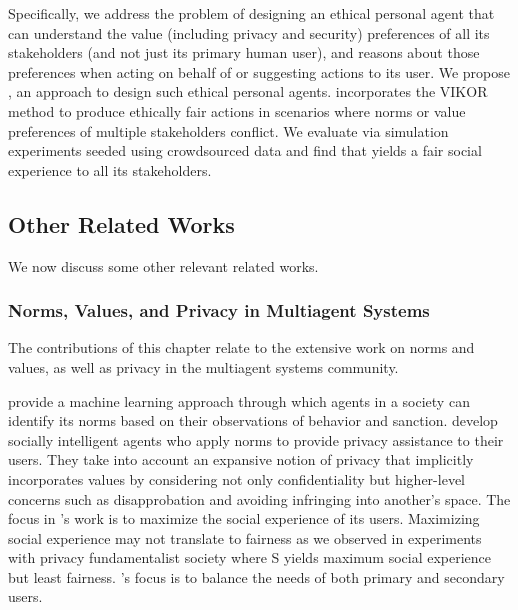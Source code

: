 Specifically, we address the problem of designing an ethical personal agent that can understand the value (including privacy and security) preferences of all its stakeholders (and not just its primary human user), and reasons about those preferences when acting on behalf of or suggesting actions to its user. We propose \frameworkAinur, an approach to design such ethical personal agents. \frameworkAinur incorporates the VIKOR method to produce ethically fair actions in scenarios where norms or value preferences of multiple stakeholders conflict. We evaluate \frameworkAinur via simulation experiments seeded using crowdsourced data and find that \frameworkAinur yields a fair  social experience to all its stakeholders.

\subsection{Other Related Works}

We now discuss some other relevant related works. 


\subsubsection{Norms, Values, and Privacy in Multiagent Systems}
The contributions of this chapter relate to the extensive work on norms and values, as well as privacy in the multiagent systems community.

\citet{Cranefield+16:norm-identification} provide a machine learning approach through which agents in a society can identify its norms based on their observations of behavior and sanction. 
\citet{IJCAI-18:Poros} develop socially intelligent agents who apply norms to provide privacy assistance to their users. They take into account an expansive notion of privacy that implicitly incorporates values by considering not only confidentiality but higher-level concerns such as disapprobation and avoiding infringing into another's space. 
The focus in \citet{IJCAI-18:Poros}'s work is to maximize the social experience of its users. Maximizing social experience may not translate to fairness as we observed in experiments with privacy fundamentalist society where S yields maximum social experience but least fairness. 
\frameworkAinur's focus is to balance the needs of both primary and secondary users. 

